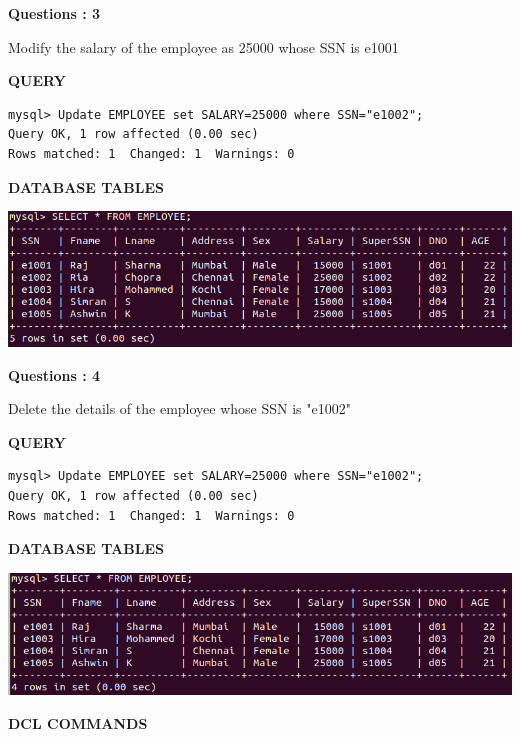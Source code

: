 \documentclass[a4paper,12pt]{report}
\begin{document}
\begin{flushleft}
    \textbf{Questions : 3}
\end{flushleft}
Modify the salary of the employee as 25000 whose SSN is e1001
\begin{flushleft}
		\textbf{QUERY }
	\end{flushleft}
\begin{verbatim}
mysql> Update EMPLOYEE set SALARY=25000 where SSN="e1002";
Query OK, 1 row affected (0.00 sec)
Rows matched: 1  Changed: 1  Warnings: 0

\end{verbatim}


\begin{flushleft}
		\textbf{DATABASE TABLES} 
\end{flushleft} 

\includegraphics[scale=0.5]{UPDATE.png}

\begin{flushleft}
    \textbf{Questions : 4}
\end{flushleft}
Delete the details of the employee whose SSN is "e1002"
\begin{flushleft}
		\textbf{QUERY }
	\end{flushleft}
\begin{verbatim}
mysql> Update EMPLOYEE set SALARY=25000 where SSN="e1002";
Query OK, 1 row affected (0.00 sec)
Rows matched: 1  Changed: 1  Warnings: 0

\end{verbatim}


\begin{flushleft}
		\textbf{DATABASE TABLES} 
\end{flushleft} 

\includegraphics[scale=0.5]{DELETE.png}
\newpage
\begin{center}
		\large\textbf{DCL COMMANDS}
	\end{center}
	
\end{document}
